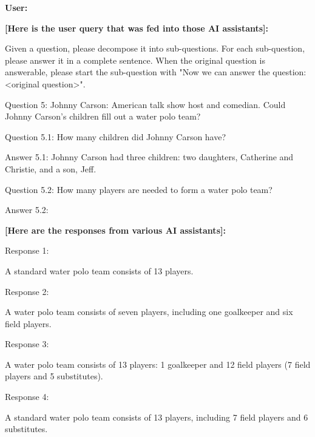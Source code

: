 \begin{center}
	\small
	\begin{tcolorbox}[width=1\linewidth,title={\textbf{An Example ICL Demonstration of StrategyQA for Aggregators: User Query}}]

\textbf{User:}


\textbf{[Here is the user query that was fed into those AI assistants]:}

Given a question, please decompose it into sub-questions. For each sub-question, please answer it in a complete sentence. When the original question is answerable, please start the sub-question with "Now we can answer the question: \textless{}original question\textgreater{}".

Question 5: Johnny Carson: American talk show host and comedian. Could Johnny Carson's children fill out a water polo team?

Question 5.1: How many children did Johnny Carson have?

Answer 5.1: Johnny Carson had three children: two daughters, Catherine and Christie, and a son, Jeff.

Question 5.2: How many players are needed to form a water polo team?

Answer 5.2:

\textbf{[Here are the responses from various AI assistants]:}

Response 1:

A standard water polo team consists of 13 players.

Response 2:

A water polo team consists of seven players, including one goalkeeper and six field players.

Response 3:

A water polo team consists of 13 players: 1 goalkeeper and 12 field players (7 field players and 5 substitutes).

Response 4:

A standard water polo team consists of 13 players, including 7 field players and 6 substitutes.

	\end{tcolorbox}
\end{center}


\newpage



